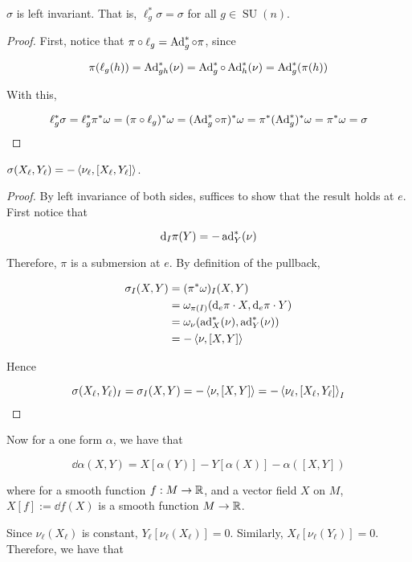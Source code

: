 \documentclass{article}
\DeclareMathOperator{\SU}{SU}
\begin{document}
\begin{lemma}
    \label{lem:left-inv}
    \(\sigma\) is left invariant. That is, \(\ell_g^*\sigma = \sigma\) for all \(g \in \SU(n)\).
\end{lemma}

\begin{proof}
    First, notice that \(\pi \circ \ell_g = \operatorname{Ad}_g^* \circ \pi\), since

    \[\pi(\ell_g(h)) = \operatorname{Ad}_{gh}^*(\nu) = \operatorname{Ad}_g^*\circ \operatorname{Ad}_h^*(\nu) = \operatorname{Ad}_g^*(\pi(h))\]

    With this,

    \[\ell_g^*\sigma = \ell_g^*\pi^*\omega = (\pi\circ\ell_g)^*\omega = (\operatorname{Ad}_g^* \circ \pi)^*\omega = \pi^*(\operatorname{Ad}_g^*)^*\omega = \pi^*\omega = \sigma\]
\end{proof}

\begin{lemma}
    \(\sigma(X_\ell, Y_\ell) = -\left\langle \nu_\ell, [X_\ell, Y_\ell] \right\rangle\).
\end{lemma}

\begin{proof}
    By left invariance of both sides, suffices to show that the result holds at \(e\). First notice that

    \[\dd_I\pi(Y) = -\operatorname{ad}_Y^*(\nu)\]

    Therefore, \(\pi\) is a submersion at \(e\). By definition of the pullback,

    \begin{align*}
        \sigma_I(X, Y) &= (\pi^*\omega)_I(X, Y)\\ 
        &= \omega_{\pi(I)}(\dd_e\pi \cdot X, \dd_e\pi\cdot Y) \\
        &= \omega_\nu(\operatorname{ad}_X^*(\nu), \operatorname{ad}_Y^*(\nu)) \\
        &= -\left\langle \nu, [X, Y] \right\rangle
    \end{align*}

    Hence

    \[\sigma(X_\ell, Y_\ell)_I = \sigma_I(X, Y) = -\left\langle \nu, [X, Y] \right\rangle = -\left\langle \nu_\ell, [X_\ell, Y_\ell] \right\rangle_I\]
\end{proof}

Now for a one form \(\alpha\), we have that

\[\dd\alpha(X, Y) = X[\alpha(Y)] - Y[\alpha(X)] - \alpha([X, Y])\]

where for a smooth function \(f : M \to \mathbb{R}\), and a vector field \(X\) on \(M\), \(X[f] := \dd f(X)\) is a smooth function \(M \to \mathbb{R}\).

Since \(\nu_\ell(X_\ell)\) is constant, \(Y_\ell[\nu_\ell(X_\ell)] = 0\). Similarly, \(X_\ell[\nu_\ell(Y_\ell)] = 0\). Therefore, we have that
\end{document}
